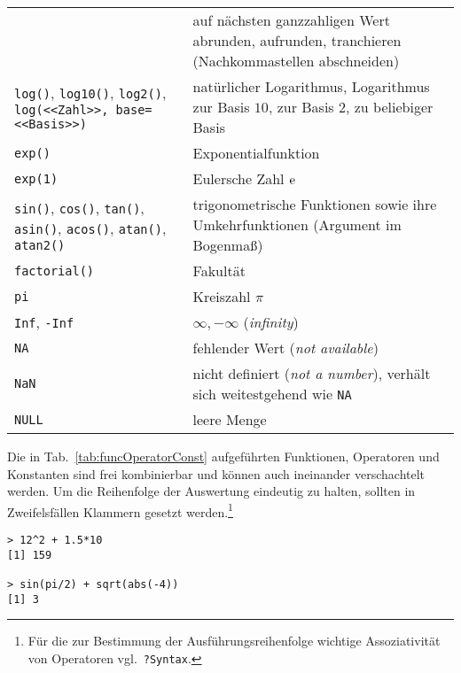 \begin{longtable}{p{5.1cm}p{7.4cm}}
\index[func]{trunc()@\lstinline{trunc()}} & auf nächsten ganzzahligen Wert \index{Zahlen!runden} abrunden, aufrunden, tranchieren (Nachkommastellen abschneiden)\\
\lstinline!log()!, \lstinline!log10()!, \lstinline!log2()!, \lstinline[breaklines=false]!log(<<Zahl>>, base=<<Basis>>)! \index[func]{log()@\lstinline{log(), log2(), log10()}} & natürlicher \index{Zahlen!Logarithmus} Logarithmus, Logarithmus zur Basis $10$, zur Basis $2$, zu beliebiger Basis\\
\lstinline!exp()!\index[func]{exp()@\lstinline{exp()}} & Exponentialfunktion\index{Exponentialfunktion}\\
\lstinline!exp(1)! & Eulersche Zahl \index{Zahlen!e@$\euler$} $\euler$\\
\lstinline!sin()!, \lstinline!cos()!, \lstinline!tan()!, \lstinline!asin()!, \lstinline[breaklines=false]!acos()!, \lstinline!atan()!, \lstinline!atan2()! \index[func]{sin()@\lstinline{sin()}} \index[func]{cos()@\lstinline{cos()}} \index[func]{tan()@\lstinline{tan()}} \index[func]{asin()@\lstinline{asin()}} \index[func]{acos()@\lstinline{acos()}} \index[func]{atan()@\lstinline{atan()}} \index[func]{atan2()@\lstinline{atan2()}} & trigonometrische Funktionen \index{trigonometrische Funktionen} \index{Winkelfunktionen|see{trigonometrische Funktionen}} sowie ihre Umkehrfunktionen (Argument im Bogenmaß)\\
\lstinline!factorial()! \index[func]{factorial()@\lstinline{factorial()}} \index{Zahlen!Fakultät} & Fakultät\\
\lstinline!pi! \index[func]{pi@\lstinline{pi}} \index{Zahlen!PI@$\pi$} & Kreiszahl $\pi$\\
\lstinline!Inf!, \lstinline!-Inf! \index[func]{Inf@\lstinline{Inf}} & $\infty, -\infty$ \index{Zahlen!unendlich} (\emph{infinity})\\
\lstinline!NA! \index[func]{NA@\lstinline{NA}} & fehlender Wert \index{Daten!fehlende Werte} (\emph{not available})\\
\lstinline!NaN! \index[func]{NaN@\lstinline{NaN}} & nicht definiert (\emph{not a number}), verhält sich weitestgehend wie \lstinline!NA!\\
\lstinline!NULL! \index[func]{NULL@\lstinline{NULL}} & leere Menge\index{leere Menge}\\\hline
\end{longtable}

Die in Tab.\ \ref{tab:funcOperatorConst} aufgeführten Funktionen, Operatoren und Konstanten sind frei kombinierbar und können auch ineinander verschachtelt werden. Um die Reihenfolge der Auswertung eindeutig zu halten, sollten in Zweifelsfällen Klammern gesetzt werden.\footnote{Für die zur Bestimmung der Ausführungsreihenfolge wichtige Assoziativität von Operatoren vgl.\ \lstinline!?Syntax!.}
\begin{lstlisting}
> 12^2 + 1.5*10
[1] 159

> sin(pi/2) + sqrt(abs(-4))
[1] 3
\end{lstlisting}

